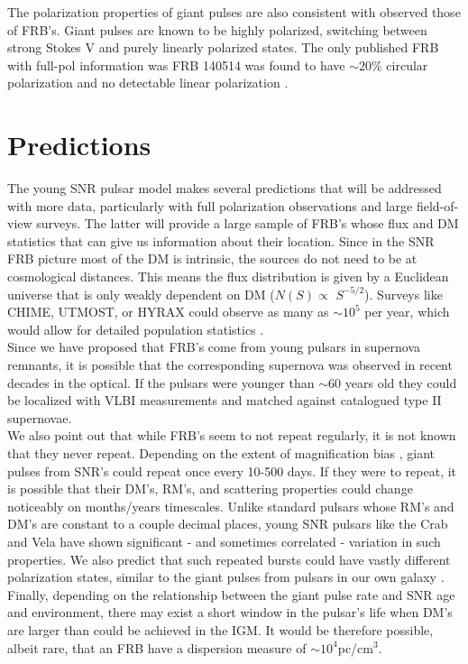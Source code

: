 \documentclass[useAMS,usenatbib]{emulateapj}
\begin{document}
The polarization properties of giant pulses are also consistent with
observed those of FRB's. Giant pulses are known to be highly polarized, 
switching between strong Stokes V and purely linearly polarized states. 
The only published FRB with full-pol information was FRB 140514 was 
found to have $\sim20\%$ circular polarization and no detectable 
linear polarization \cite{}.

\section{Predictions}
\label{sec-predictions}

The young SNR pulsar model makes several predictions that will
be addressed with more data, particularly with full polarization 
observations and large field-of-view surveys. 
The latter will provide a large sample of FRB's whose flux and DM statistics
that can give us information about their location. Since in the SNR FRB picture
most of the DM is intrinsic, the sources do not need to be at cosmological 
distances. This means the flux distribution is given by a Euclidean universe
that is only weakly dependent on DM ($N(S) \propto$ $S^{-5/2}$). Surveys
like CHIME, UTMOST, or HYRAX could observe as many as $\sim10^5$
per year, which would allow for detailed population statistics \cite{}.
\\
Since we have proposed that FRB's come from young pulsars 
in supernova remnants, it is possible that the corresponding 
supernova was observed in recent decades in the optical. If the pulsars
were younger than $\sim$60 years old they could be localized with VLBI
measurements and matched against catalogued type II supernovae. 
\\
We also point out that while FRB's seem to not repeat regularly, 
it is not known that they never repeat. Depending on the extent of
magnification bias \cite{http://arxiv.org/pdf/1405.5945.pdf}, giant pulses
from SNR's could repeat once every 10-500 days. If they were to repeat,
it is possible that their DM's, RM's, and scattering properties could 
change noticeably on months/years timescales. Unlike standard pulsars 
whose RM's and DM's are constant to a couple decimal places, young 
SNR pulsars like the Crab and Vela have shown significant - and sometimes
correlated - variation in such properties. We also predict that such repeated 
bursts could have vastly different polarization states, similar to the giant 
pulses from pulsars in our own galaxy \cite{vela/crab source}.
\\
Finally, depending on the relationship between the giant pulse rate and SNR
age and environment, there may exist a short window in the pulsar's life when 
DM's are larger than could be achieved in the IGM. It would be therefore 
possible, albeit rare, that an FRB have a dispersion
 measure of $\sim10^4$pc/cm$^3$.
\end{document}
